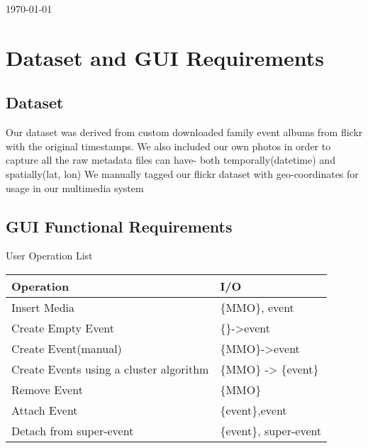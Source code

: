 \documentclass[11pt]{article}
\begin{document}
\begin{titlepage}
	
	
	\vfill\vfill\vfill %
	

	
	\vfill
	 
	{\large\today} %
	\vfill
	
	\vfill %
	
\end{titlepage}


\tableofcontents



\newpage
\section{Dataset and GUI Requirements}
\label{sec:org6068936}
\subsection{Dataset}
\label{sec:org92fcc91}
Our dataset was derived from custom downloaded family event albums from flickr with the original timestamps.
We also included our own photos in order to capture all the raw metadata files can have- both temporally(datetime) and spatially(lat, lon)
We manually tagged our flickr dataset with geo-coordinates for usage in our multimedia system

\subsection{GUI Functional Requirements}
\label{sec:org18914f0}
User Operation List
\begin{center}
\begin{tabular}{ll}
\hline
Operation & I/O\\
\hline
Insert Media & \{MMO\}, event\\
Create Empty Event & \{\}->event\\
Create Event(manual) & \{MMO\}->event\\
Create Events using a cluster algorithm & \{MMO\} -> \{event\}\\
Remove Event & \{MMO\}\\
Attach Event & \{event\},event\\
Detach from super-event & \{event\}, super-event\\
\hline
\end{tabular}
\end{center}
\end{document}
